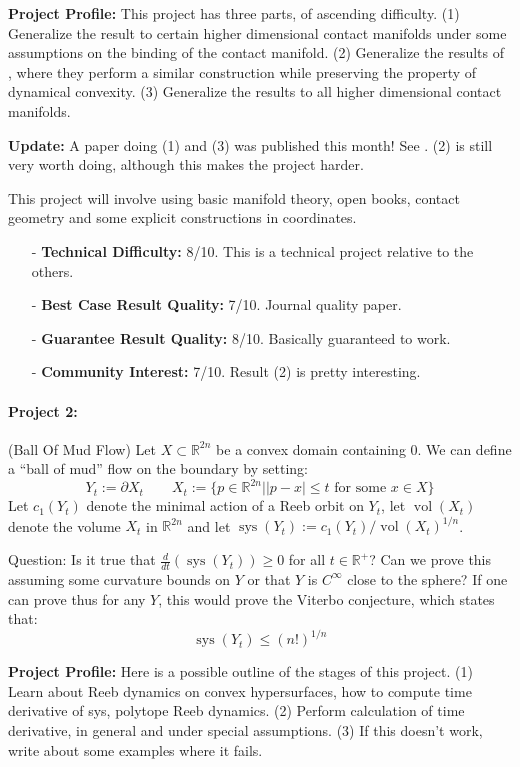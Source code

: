 \documentclass[12pt]{article}
\numberwithin{equation}{section}
\theoremstyle{definition}
\newcommand{\R}{{\mathbb R}}
\newcommand{\op}{\operatorname}
\begin{document}
{\bf Project Profile:} This project has three parts, of ascending difficulty. (1) Generalize the result to certain higher dimensional contact manifolds under some assumptions on the binding of the contact manifold. (2) Generalize the results of \cite{abhs2017b}, where they perform a similar construction while preserving the property of dynamical convexity. (3) Generalize the results to all higher dimensional contact manifolds.

{\bf Update:} A paper doing (1) and (3) was published this month! See \cite{m2018}. (2) is still very worth doing, although this makes the project harder.

This project will involve using basic manifold theory, open books, contact geometry and some explicit constructions in coordinates.

\begin{itemize}
	\item[-] {\bf Technical Difficulty:} 8/10. This is a technical project relative to the others.
	\item[-] {\bf Best Case Result Quality:} 7/10. Journal quality paper.
	\item[-] {\bf Guarantee Result Quality:} 8/10. Basically guaranteed to work.
	\item[-] {\bf Community Interest:} 7/10. Result (2) is pretty interesting.
\end{itemize}

\paragraph{Project 2:} (Ball Of Mud Flow) Let $X \subset \R^{2n}$ be a convex domain containing $0$. We can define a ``ball of mud'' flow on the boundary by setting:
\[
Y_t := \partial X_t \qquad X_t := \{p \in \R^{2n}| |p - x| \le t \text{ for some }x \in X\}
\]
Let $c_1(Y_t)$ denote the minimal action of a Reeb orbit on $Y_t$, let $\op{vol}(X_t)$ denote the volume $X_t$ in $\R^{2n}$ and let $\op{sys}(Y_t) := c_1(Y_t)/\op{vol}(X_t)^{1/n}$.

Question: Is it true that $\frac{d}{dt}(\op{sys}(Y_t)) \ge 0$ for all $t \in \R^+$? Can we prove this assuming some curvature bounds on $Y$ or that $Y$ is $C^\infty$ close to the sphere? If one can prove thus for any $Y$, this would prove the Viterbo conjecture, which states that:
\[
\op{sys}(Y_t) \le (n!)^{1/n}
\]

{\bf Project Profile:} Here is a possible outline of the stages of this project. (1) Learn about Reeb dynamics on convex hypersurfaces, how to compute time derivative of sys, polytope Reeb dynamics. (2) Perform calculation of time derivative, in general and under special assumptions. (3) If this doesn't work, write about some examples where it fails.
\end{document}
